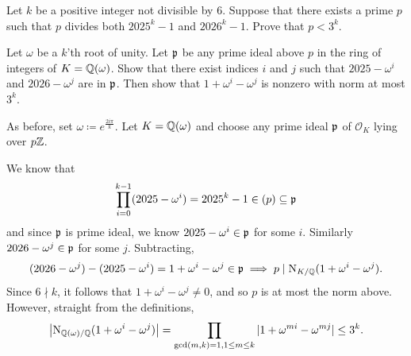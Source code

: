 \begin{problem}
	[USEMO 2025]
	\onechili
	Let $k$ be a positive integer not divisible by $6$.
	Suppose that there exists a prime $p$
	such that $p$ divides both $2025^k-1$ and $2026^k-1$.
	Prove that $p<3^k$.
	\begin{hint}
		Let $\omega$ be a $k$'th root of unity.
		Let $\mathfrak p$ be any prime ideal above $p$ in the ring of integers of $K = \mathbb Q(\omega)$.
		Show that there exist indices $i$ and $j$ such that
		$2025-\omega^i$ and $2026-\omega^j$ are in $\mathfrak p$.
		Then show that $1+\omega^i-\omega^j$ is nonzero with norm at most $3^k$.
	\end{hint}
	\begin{sol}
		As before, set $\omega \coloneq e^{\frac{2i\pi}{k}}$.
		Let $K = \mathbb Q(\omega)$ and choose any prime ideal $\mathfrak p$ of $\mathcal{O}_K$ lying over $p\mathbb Z$.

		We know that
		\[ \prod_{i=0}^{k-1} (2025-\omega^i) = 2025^k-1 \in (p) \subseteq \mathfrak p \]
		and since $\mathfrak p$ is prime ideal, we know $2025-\omega^i \in \mathfrak p$ for some $i$.
		Similarly $2026-\omega^j \in \mathfrak p$ for some $j$.
		Subtracting,
		\[ (2026-\omega^j) - (2025-\omega^i) = 1 + \omega^i - \omega^j \in \mathfrak p \implies p \mid \operatorname{N}_{K/\mathbb Q}(1+\omega^i-\omega^j). \]
		Since $6\nmid k$, it follows that $1 + \omega^i - \omega^j \neq 0$,
		and so $p$ is at most the norm above.
		However, straight from the definitions,
		\[  \left|\operatorname{N}_{\mathbb{Q}(\omega)/\mathbb{Q}}(1+\omega^i-\omega^j) \right|
			= \prod_{\gcd(m,k)=1, 1\le m\le k} |1+\omega^{mi}-\omega^{mj}| \le 3^k. \]
	\end{sol}
\end{problem}
